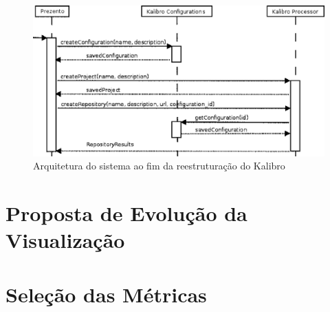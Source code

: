 \begin{figure}[h]
	\centering
	\label{processingSeqDiag}
		\includegraphics[keepaspectratio=true,scale=0.5]{figuras/processingSeqDiag.eps}
	\caption{Arquitetura do sistema ao fim da reestruturação do Kalibro \cite{meirellesCibse2015}}
\end{figure}

\newpage

\section{Proposta de Evolução da Visualização}

\section{Seleção das Métricas}

